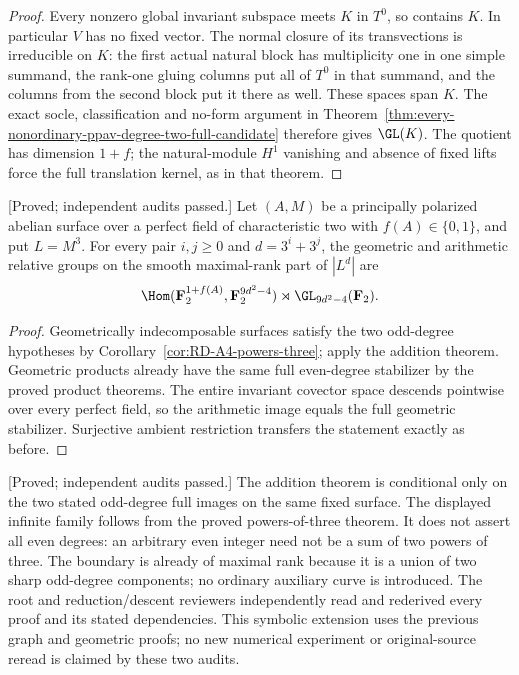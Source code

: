 \begin{proof}
Every nonzero global invariant subspace meets $K$ in $T^0$,
so contains $K$. In particular $V$ has no fixed vector. The
normal closure of its transvections is irreducible on $K$:
the first actual natural block has multiplicity one in one
simple summand, the rank-one gluing columns put all of $T^0$
in that summand, and the columns from the second block put
it there as well. These spaces span $K$. The exact socle,
classification and no-form argument in
Theorem~\ref{thm:every-nonordinary-ppav-degree-two-full-candidate}
therefore gives $\GL(K)$. The quotient has dimension $1+f$;
the natural-module $H^1$ vanishing and absence of fixed lifts
force the full translation kernel, as in that theorem.
\end{proof}

\begin{corollary}
\label{cor:nonordinary-even-three-power-sums-candidate}
\textup{[Proved; independent audits passed.]}
Let $(A,M)$ be a principally polarized abelian surface over a
perfect field of characteristic two with $f(A)\in\{0,1\}$,
and put $L=M^3$. For every pair $i,j\ge0$ and
$d=3^i+3^j$, the geometric and arithmetic relative groups on
the smooth maximal-rank part of $|L^d|$ are
\[
 \Hom(\mathbf F_2^{1+f(A)},\mathbf F_2^{9d^2-4})
                               \rtimes\GL_{9d^2-4}(\mathbf F_2).
\]
\end{corollary}
\begin{proof}
Geometrically indecomposable surfaces satisfy the two odd-degree
hypotheses by Corollary~\ref{cor:RD-A4-powers-three}; apply the
addition theorem. Geometric products already have the same
full even-degree stabilizer by the proved product theorems.
The entire invariant covector space descends pointwise over
every perfect field, so the arithmetic image equals the full
geometric stabilizer. Surjective ambient restriction transfers
the statement exactly as before.
\end{proof}

\begin{remark}[Scope]
\label{rem:nonordinary-even-addition-scope-candidate}
\textup{[Proved; independent audits passed.]}
The addition theorem is conditional only on the two stated
odd-degree full images on the same fixed surface. The displayed
infinite family follows from the proved powers-of-three theorem.
It does not assert all even degrees: an arbitrary even integer
need not be a sum of two powers of three. The boundary is already
of maximal rank because it is a union of two sharp odd-degree
components; no ordinary auxiliary curve is introduced. The root and
reduction/descent reviewers independently read and rederived every
proof and its stated dependencies. This symbolic extension uses the
previous graph and geometric proofs; no new numerical experiment
or original-source reread is claimed by these two audits.
\end{remark}
